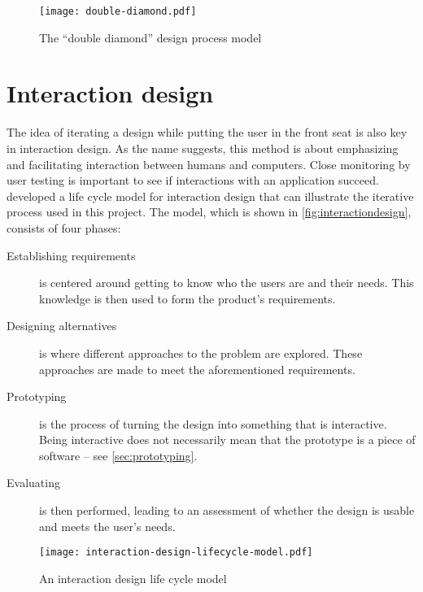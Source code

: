 \begin{figure}
    \centering
    \texttt{[image: double-diamond.pdf]}
    \caption{The \enquote{double diamond} design process model}
    \label{fig:doublediamond}
\end{figure}



\section{Interaction design}
\label{sec:interactiondesign}

The idea of iterating a design while putting the user in the front seat is also key in interaction design. As the name suggests, this method is about emphasizing and facilitating interaction between humans and computers. Close monitoring by user testing is important to see if interactions with an application succeed. \textcite{preece2015} developed a life cycle model for interaction design that can illustrate the iterative process used in this project. The model, which is shown in \autoref{fig:interactiondesign}, consists of four phases:

\begin{description}
    \item[Establishing requirements] is centered around getting to know who the users are and their needs. This knowledge is then used to form the product's requirements.
    \item[Designing alternatives] is where different approaches to the problem are explored. These approaches are made to meet the aforementioned requirements.
    \item[Prototyping] is the process of turning the design into something that is interactive. Being interactive does not necessarily mean that the prototype is a piece of software -- see \autoref{sec:prototyping}.
    \item[Evaluating] is then performed, leading to an assessment of whether the design is usable and meets the user's needs.
\end{description}

\begin{figure}
    \centering
    \texttt{[image: interaction-design-lifecycle-model.pdf]}
    \caption{An interaction design life cycle model}
    \label{fig:interactiondesign}
\end{figure}

